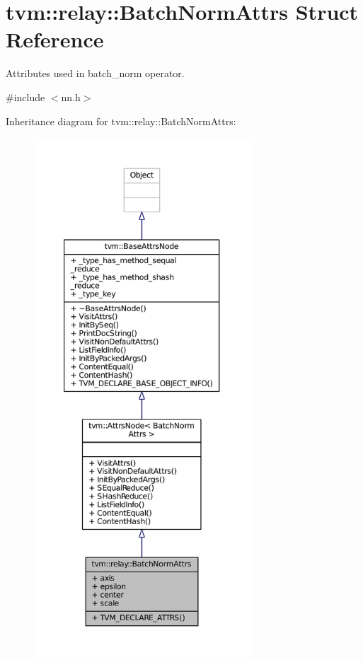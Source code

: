 \hypertarget{structtvm_1_1relay_1_1BatchNormAttrs}{}\section{tvm\+:\+:relay\+:\+:Batch\+Norm\+Attrs Struct Reference}
\label{structtvm_1_1relay_1_1BatchNormAttrs}


Attributes used in batch\+\_\+norm operator.  




{\ttfamily \#include $<$nn.\+h$>$}



Inheritance diagram for tvm\+:\+:relay\+:\+:Batch\+Norm\+Attrs\+:
\nopagebreak
\begin{figure}[H]
\begin{center}
\leavevmode
\includegraphics[height=550pt]{structtvm_1_1relay_1_1BatchNormAttrs__inherit__graph}
\end{center}
\end{figure}


